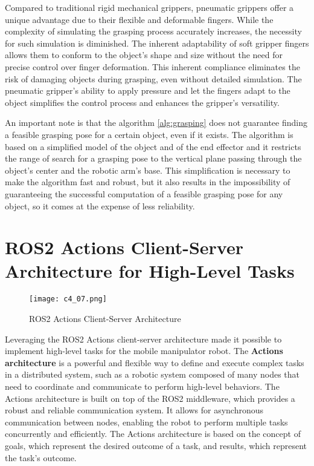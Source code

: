Compared to traditional rigid mechanical grippers, pneumatic grippers offer a unique advantage due to their 
flexible and deformable fingers. While the complexity of simulating the grasping process accurately increases,
the necessity for such simulation is diminished. The inherent adaptability of soft gripper fingers allows them 
to conform to the object's shape and size without the need for precise control over finger deformation.
This inherent compliance eliminates the risk of damaging objects during grasping, even without detailed simulation.
The pneumatic gripper's ability to apply pressure and let the fingers adapt to the object simplifies 
the control process and enhances the gripper's versatility.

An important note is that the algorithm \ref{alg:grasping} does not guarantee finding a feasible grasping
pose for a certain object, even if it exists. 
The algorithm is based on a simplified model of the object and of the end effector and it
restricts the range of search for a grasping pose to the vertical plane passing through the object's center
and the robotic arm's base. This simplification is necessary to make the algorithm fast and robust, but it
also results in the impossibility of guaranteeing the successful computation of a feasible grasping pose
for any object, so it comes at the expense of less reliability.

\section{ROS2 Actions Client-Server Architecture for High-Level Tasks}

\begin{figure}[h]
    \centering
    \texttt{[image: c4\_07.png]}
    \caption{ROS2 Actions Client-Server Architecture}
    \label{fig:actions_architecture}
\end{figure}

Leveraging the ROS2 Actions client-server architecture made it possible to implement high-level tasks for the mobile manipulator
robot. The \textbf{Actions architecture} is a powerful and flexible way to define and execute complex tasks
in a distributed system, such as a robotic system composed of many nodes that need to coordinate and communicate
to perform high-level behaviors. The Actions architecture is built on top of the ROS2 middleware, which provides
a robust and reliable communication system. It allows for asynchronous communication between nodes,
enabling the robot to perform multiple tasks concurrently and efficiently. The Actions architecture is based on
the concept of goals, which represent the desired outcome of a task, and results, which represent the task's outcome.

